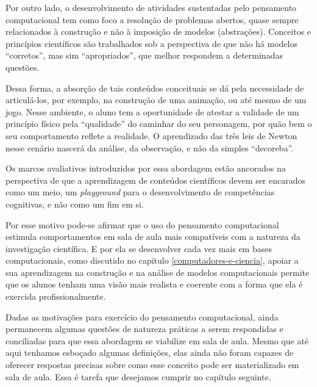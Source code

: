 Por outro lado, o desenvolvimento de atividades sustentadas pelo pensamento computacional tem como foco a resolução de problemas abertos, quase sempre relacionados à construção e não à imposição de modelos (abstrações). Conceitos e princípios científicos são trabalhados sob a perspectiva de que não há modelos ``corretos'', mas sim ``apropriados'', que melhor respondem a determinadas questões. 

Dessa forma, a absorção de tais conteúdos conceituais se dá pela necessidade de articulá-los, por exemplo, na construção de uma animação, ou até mesmo de um jogo. Nesse ambiente, o aluno tem a oportunidade de atestar a validade de um princípio físico pela ``qualidade'' do caminhar do seu personagem, por quão bem o seu comportamento reflete a realidade. O aprendizado das três leis de Newton nesse cenário nascerá da análise, da observação, e não da simples ``decoreba''. 

Os marcos avaliativos introduzidos por essa abordagem estão ancorados na perspectiva de que a aprendizagem de conteúdos científicos devem ser encarados como um meio, um \textit{playground} para o desenvolvimento de competências cognitivas, e não como um fim em si. 

Por esse motivo pode-se afirmar que o uso do pensamento computacional estimula comportamentos em sala de aula mais compatíveis com a natureza da investigação científica. E por ela se desenvolver cada vez mais em bases computacionais, como discutido no capítulo \ref{computadores-e-ciencia}, apoiar a sua aprendizagem na construção e na análise de modelos computacionais permite que os alunos tenham uma visão mais realista e coerente com a forma que ela é exercida profissionalmente. 

Dadas as motivações para exercício do pensamento computacional, ainda permanecem algumas questões de natureza práticas a serem respondidas e conciliadas para que essa abordagem se viabilize em sala de aula. Mesmo que até aqui tenhamos esboçado algumas definições, elas ainda não foram capazes de oferecer respostas precisas sobre como esse conceito pode ser materializado em sala de aula. Essa é tarefa que desejamos cumprir no capítulo seguinte.






